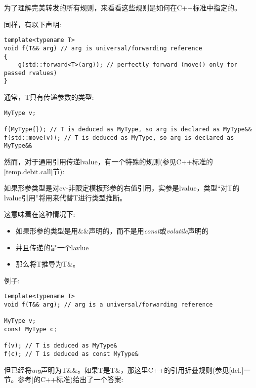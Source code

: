 为了理解完美转发的所有规则，来看看这些规则是如何在C++标准中指定的。\par

同样，有以下声明:\par

\begin{lstlisting}[caption={}]
template<typename T>
void f(T&& arg) // arg is universal/forwarding reference
{
	g(std::forward<T>(arg)); // perfectly forward (move() only for passed rvalues)
}
\end{lstlisting}

通常，T只有传递参数的类型:\par

\begin{lstlisting}[caption={}]
MyType v;

f(MyType{}); // T is deduced as MyType, so arg is declared as MyType&&
f(std::move(v)); // T is deduced as MyType, so arg is declared as MyType&&
\end{lstlisting}

然而，对于通用引用传递lvalue，有一个特殊的规则(参见C++标准的[temp.debit.call]节):\par

如果形参类型是对cv-非限定模板形参的右值引用，实参是lvalue，类型“对T的lvalue引用”将用来代替T进行类型推断。\par

\par

这意味着在这种情况下:\par

\begin{itemize}
	\item 如果形参的类型是用\&\&声明的，而不是用\textit{const}或\textit{volatile}声明的
	\item 并且传递的是一个lavlue
	\item 那么将T推导为T\&。
\end{itemize}

例子:\par

\begin{lstlisting}[caption={}]
template<typename T>
void f(T&& arg); // arg is a universal/forwarding reference

MyType v;
const MyType c;

f(v); // T is deduced as MyType&
f(c); // T is deduced as const MyType&
\end{lstlisting}

但已经将\textit{arg}声明为T\&\&。如果T是T\&，那这里C++的引用折叠规则(参见[dcl.]一节。参考]的C++标准)给出了一个答案:\par


